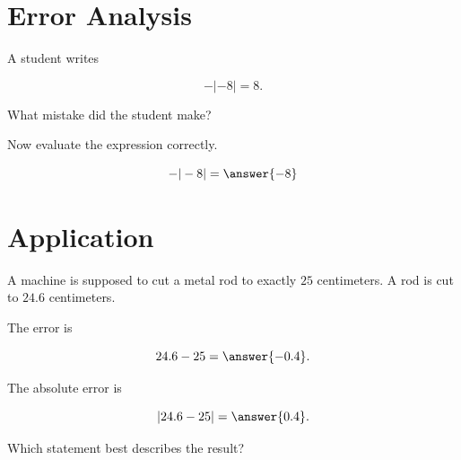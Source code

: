 \documentclass{ximera}[font=12pt]
\begin{document}
\section*{Error Analysis}

\begin{problem}
A student writes

\[
-|-8|=8.
\]

What mistake did the student make?

\begin{multipleChoice}
\end{multipleChoice}

Now evaluate the expression correctly.

\[
-|-8|=\answer{-8}
\]

\end{problem}


\section*{Application}

\begin{problem}
A machine is supposed to cut a metal rod to exactly $25$ centimeters. A rod is cut to $24.6$ centimeters.

The error is

\[
24.6-25=\answer{-0.4}.
\]

The absolute error is

\[
|24.6-25|=\answer{0.4}.
\]

Which statement best describes the result?

\begin{multipleChoice}
\end{multipleChoice}

\end{problem}
\end{document}
